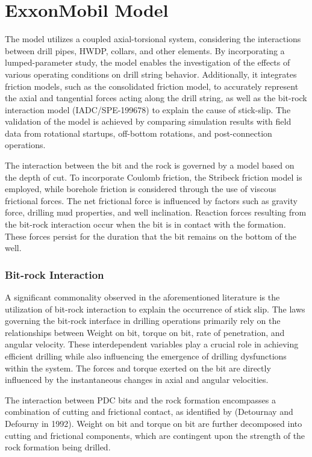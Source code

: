 \chapter{ExxonMobil Model} 

The model utilizes a coupled axial-torsional system, considering the interactions between drill pipes, HWDP, collars, and other elements. By incorporating a lumped-parameter study, the model enables the investigation of the effects of various operating conditions on drill string behavior. Additionally, it integrates friction models, such as the consolidated friction model, to accurately represent the axial and tangential forces acting along the drill string, as well as the bit-rock interaction model (IADC/SPE-199678) to explain the cause of stick-slip. The validation of the model is achieved by comparing simulation results with field data from rotational startups, off-bottom rotations, and post-connection operations. 

The interaction between the bit and the rock is governed by a model based on the depth of cut. To incorporate Coulomb friction, the Stribeck friction model is employed, while borehole friction is considered through the use of viscous frictional forces. The net frictional force is influenced by factors such as gravity force, drilling mud properties, and well inclination. Reaction forces resulting from the bit-rock interaction occur when the bit is in contact with the formation. These forces persist for the duration that the bit remains on the bottom of the well. 


\subsection{Bit-rock Interaction}

A significant commonality observed in the aforementioned literature is the utilization of bit-rock interaction to explain the occurrence of stick slip. The laws governing the bit-rock interface in drilling operations primarily rely on the relationships between Weight on bit, torque on bit, rate of penetration, and angular velocity. These interdependent variables play a crucial role in achieving efficient drilling while also influencing the emergence of drilling dysfunctions within the system. The forces and torque exerted on the bit are directly influenced by the instantaneous changes in axial and angular velocities.

The interaction between PDC bits and the rock formation encompasses a combination of cutting and frictional contact, as identified by (Detournay and Defourny in 1992). Weight on bit and torque on bit are further decomposed into cutting and frictional components, which are contingent upon the strength of the rock formation being drilled.

